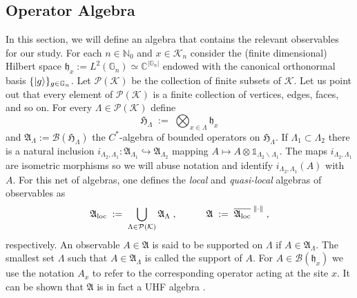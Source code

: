 \documentclass[a4paper,12pt,twoside,reqno]{amsart}
\DeclarePairedDelimiter\ket{\lvert}{\rangle}
\theoremstyle{plain}
\theoremstyle{definition}
\theoremstyle{remark}
\numberwithin{equation}{section}
\numberwithin{figure}{section}
\numberwithin{table}{section}
\def\norm#1{\left\|#1\right\|}
\newcommand{\f}[1]{\mathcal{#1}}
\newcommand{\n}[1]{\mathbb{#1}}
\begin{document}
	
	
	
	
	
	
	
	
	\subsection{Operator Algebra}\label{sec:Al-Op}
	In this section, we will define an algebra that contains the relevant observables for our study.
	For each $n\in\n{N}_0$ and  $x\in \f{K}_n$ consider the (finite dimensional) Hilbert space $\mathfrak{h}_x:=L^2(\n{G}_n)\simeq \n{C}^{|\n{G}_n|}$
	endowed with the canonical
	orthonormal basis  $\{\ket{g}\}_{g\in \n{G}_n}$. Let $\f{P}(\f{K})$ be the collection of finite subsets of $\f{K}$. Let us point out that every element of $\f{P}(\f{K})$ is a finite collection of vertices, edges, faces, and so on.
	For every $\Lambda\in \f{P}(\f{K})$ 
	define 
	\begin{equation*}
		\mathfrak{H}_\Lambda\;:=\;\bigotimes_{x\in \Lambda}\mathfrak{h}_x
	\end{equation*}
	and $\mathfrak{A}_\Lambda:=\mathcal{B}(\mathfrak{H}_\Lambda)$ the $C^*$-algebra of bounded operators on $\mathfrak{H}_\Lambda$. If $\Lambda_1\subset \Lambda_2$ there is a natural inclusion $i_{\Lambda_2,\Lambda_1}:\mathfrak{A}_{\Lambda_1}\hookrightarrow \mathfrak{A}_{\Lambda_2}$ mapping $A\mapsto A\otimes \n{1}_{\Lambda_2\backslash\Lambda_1} $. The maps $i_{\Lambda_2,\Lambda_1}$ are isometric morphisms so we will abuse notation and identify $i_{\Lambda_2,\Lambda_1}(A)$ with $A$. For this net of algebras, one defines the \emph{local} and  \emph{quasi-local} algebras of observables as
	\begin{equation*}
		\mathfrak{A}_{\rm loc}\;:=\;\bigcup_{\Lambda\in \f{P}(\f{K})}\mathfrak{A}_\Lambda\;,\qquad\quad\mathfrak{A}\;:=\;\overline{\mathfrak{A}_{\rm loc}}^{\;\norm{\cdot}}\;,
	\end{equation*}
	respectively. 
	An observable $A\in \mathfrak{A}$ is said to be supported on $\Lambda$ if $A\in \mathfrak{A}_\Lambda$. The smallest set $\Lambda$ such that $A\in \mathfrak{A}_\Lambda$ is called the support of $A$. For $A\in \mathcal{B}(\mathfrak{h}_x)$ we use the notation $A_x$ to refer to the corresponding operator acting at the site $x$.
	It can be shown that $\mathfrak{A}$ is in fact a UHF algebra \cite[Example 2.6.12]{Bratelli}.
	
	
	
	
	
\end{document}
